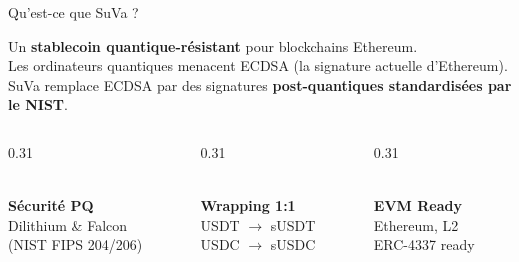 \documentclass[aspectratio=169, 12pt]{beamer}
\begin{document}
\begin{frame}[shrink=8]{Qu'est-ce que SuVa ?}

  \begin{tcolorbox}[colback=suva_blue!8, colframe=suva_blue,
    title={\bfseries SuVa (Super Value) Protocol}, fonttitle=\color{white},
    top=3pt, bottom=3pt]
    \small Un \textbf{stablecoin quantique-résistant} pour blockchains Ethereum.\\
    Les ordinateurs quantiques menacent ECDSA (la signature actuelle d'Ethereum).
    SuVa remplace ECDSA par des signatures \textbf{post-quantiques standardisées par le NIST}.
  \end{tcolorbox}

  \vspace{0.2cm}

  \begin{columns}[T]
    \begin{column}{0.31\textwidth}
      \begin{tcolorbox}[colback=gray_light, colframe=suva_blue!40, height=3cm]
        \centering
        {\color{suva_blue}\Large\faShieldAlt}\\[0.15cm]
        \textbf{Sécurité PQ}\\[0.05cm]
        {\small Dilithium \& Falcon\\(NIST FIPS 204/206)}
      \end{tcolorbox}
    \end{column}
    \begin{column}{0.31\textwidth}
      \begin{tcolorbox}[colback=gray_light, colframe=suva_blue!40, height=3cm]
        \centering
        {\color{suva_blue}\Large\faExchangeAlt}\\[0.15cm]
        \textbf{Wrapping 1:1}\\[0.05cm]
        {\small USDT $\to$ sUSDT\\USDC $\to$ sUSDC}
      \end{tcolorbox}
    \end{column}
    \begin{column}{0.31\textwidth}
      \begin{tcolorbox}[colback=gray_light, colframe=suva_blue!40, height=3cm]
        \centering
        {\color{suva_blue}\Large\faEthereum}\\[0.15cm]
        \textbf{EVM Ready}\\[0.05cm]
        {\small Ethereum, L2\\ERC-4337 ready}
      \end{tcolorbox}
    \end{column}
  \end{columns}


\end{frame}
\end{document}
